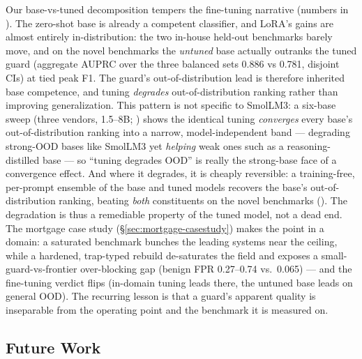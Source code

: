 \documentclass[sigconf,nonacm]{acmart}
\begin{document}
Our base-vs-tuned decomposition tempers the fine-tuning narrative (numbers in ). The zero-shot base is already a competent classifier, and LoRA's gains are almost entirely in-distribution: the two in-house held-out benchmarks barely move, and on the novel benchmarks the \emph{untuned} base actually outranks the tuned guard (aggregate AUPRC over the three balanced sets 0.886 vs 0.781, disjoint CIs) at tied peak F1. The guard's out-of-distribution lead is therefore inherited base competence, and tuning \emph{degrades} out-of-distribution ranking rather than improving generalization. This pattern is not specific to SmolLM3: a six-base sweep (three vendors, 1.5--8B; ) shows the identical tuning \emph{converges} every base's out-of-distribution ranking into a narrow, model-independent band --- degrading strong-OOD bases like SmolLM3 yet \emph{helping} weak ones such as a reasoning-distilled base --- so ``tuning degrades OOD'' is really the strong-base face of a convergence effect. And where it degrades, it is cheaply reversible: a training-free, per-prompt ensemble of the base and tuned models recovers the base's out-of-distribution ranking, beating \emph{both} constituents on the novel benchmarks (). The degradation is thus a remediable property of the tuned model, not a dead end. The mortgage case study (\S\ref{sec:mortgage-casestudy}) makes the point in a domain: a saturated benchmark bunches the leading systems near the ceiling, while a hardened, trap-typed rebuild de-saturates the field and exposes a small-guard-vs-frontier over-blocking gap (benign FPR 0.27--0.74 vs.\ 0.065) --- and the fine-tuning verdict flips (in-domain tuning leads there, the untuned base leads on general OOD). The recurring lesson is that a guard's apparent quality is inseparable from the operating point and the benchmark it is measured on.

\subsection{Future Work}\label{sec:future}
\end{document}
